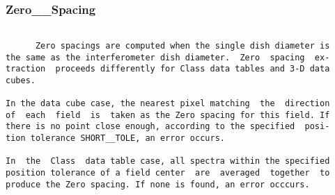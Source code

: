 \subsubsection{Zero\_\_Spacing}
\begin{verbatim}

      Zero spacings are computed when the single dish diameter is
the same as the interferometer dish diameter.  Zero  spacing  ex-
traction  proceeds differently for Class data tables and 3-D data
cubes.

In the data cube case, the nearest pixel matching  the  direction
of  each  field  is  taken as the Zero spacing for this field. If
there is no point close enough, according to the specified  posi-
tion tolerance SHORT__TOLE, an error occurs.

In  the  Class  data table case, all spectra within the specified
position tolerance of a field center  are  averaged  together  to
produce the Zero spacing. If none is found, an error occcurs.


\end{verbatim}
